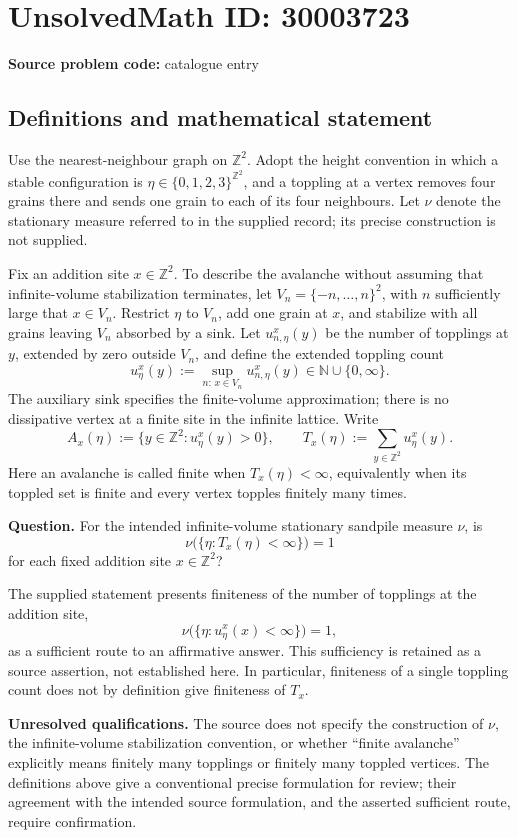 \documentclass[11pt]{article}
\newcommand{\N}{\mathbb{N}}
\newcommand{\Z}{\mathbb{Z}}
\begin{document}
\section*{UnsolvedMath ID: 30003723}
\textbf{Source problem code:} catalogue entry
\subsection{Definitions and mathematical statement}
Use the nearest-neighbour graph on \(\Z^2\). Adopt the height convention in which a stable configuration is \(\eta\in\{0,1,2,3\}^{\Z^2}\), and a toppling at a vertex removes four grains there and sends one grain to each of its four neighbours. Let \(\nu\) denote the stationary measure referred to in the supplied record; its precise construction is not supplied.

Fix an addition site \(x\in\Z^2\). To describe the avalanche without assuming that infinite-volume stabilization terminates, let \(V_n=\{-n,\ldots,n\}^2\), with \(n\) sufficiently large that \(x\in V_n\). Restrict \(\eta\) to \(V_n\), add one grain at \(x\), and stabilize with all grains leaving \(V_n\) absorbed by a sink. Let \(u_{n,\eta}^{x}(y)\) be the number of topplings at \(y\), extended by zero outside \(V_n\), and define the extended toppling count
\[
 u_{\eta}^{x}(y):=\sup_{n:\,x\in V_n}u_{n,\eta}^{x}(y)\in\N\cup\{0,\infty\}.
\]
The auxiliary sink specifies the finite-volume approximation; there is no dissipative vertex at a finite site in the infinite lattice. Write
\[
 A_x(\eta):=\{y\in\Z^2:u_{\eta}^{x}(y)>0\},\qquad
 T_x(\eta):=\sum_{y\in\Z^2}u_{\eta}^{x}(y).
\]
Here an avalanche is called finite when \(T_x(\eta)<\infty\), equivalently when its toppled set is finite and every vertex topples finitely many times.

\textbf{Question.} For the intended infinite-volume stationary sandpile measure \(\nu\), is
\[
 \nu\bigl(\{\eta:T_x(\eta)<\infty\}\bigr)=1
\]
for each fixed addition site \(x\in\Z^2\)?

The supplied statement presents finiteness of the number of topplings at the addition site,
\[
 \nu\bigl(\{\eta:u_{\eta}^{x}(x)<\infty\}\bigr)=1,
\]
as a sufficient route to an affirmative answer. This sufficiency is retained as a source assertion, not established here. In particular, finiteness of a single toppling count does not by definition give finiteness of \(T_x\).

\textbf{Unresolved qualifications.} The source does not specify the construction of \(\nu\), the infinite-volume stabilization convention, or whether ``finite avalanche'' explicitly means finitely many topplings or finitely many toppled vertices. The definitions above give a conventional precise formulation for review; their agreement with the intended source formulation, and the asserted sufficient route, require confirmation.
\end{document}
